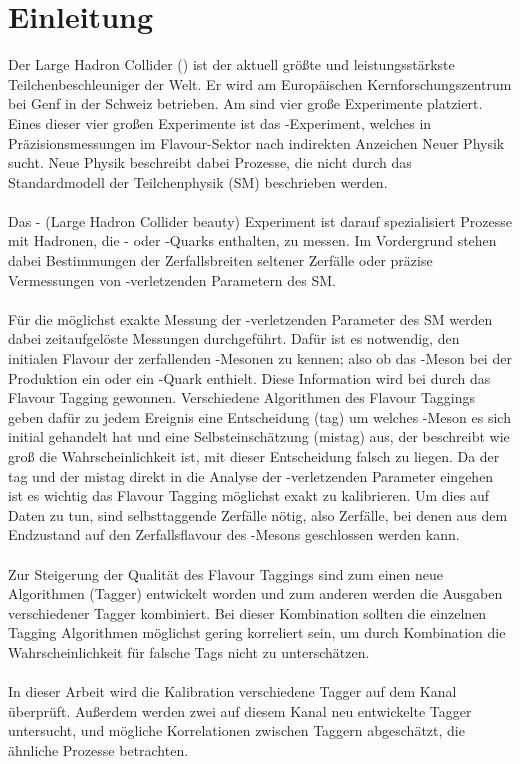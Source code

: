 \chapter{Einleitung}

Der Large Hadron Collider (\lhc) ist der aktuell größte und leistungsstärkste Teilchenbeschleuniger der Welt. Er wird am Europäischen Kernforschungszentrum \cern bei Genf in der Schweiz betrieben. Am \lhc sind vier große Experimente platziert. Eines dieser vier großen Experimente ist das \lhcb-Experiment, welches in Präzisionsmessungen im Flavour-Sektor nach indirekten Anzeichen Neuer Physik sucht. Neue Physik beschreibt dabei Prozesse, die nicht durch das Standardmodell der Teilchenphysik (SM) beschrieben werden.\\
\\
Das \lhcb- (Large Hadron Collider beauty) Experiment ist darauf spezialisiert Prozesse mit Hadronen, die \bquark- oder \cquark-Quarks enthalten, zu messen. Im Vordergrund stehen dabei Bestimmungen der Zerfallsbreiten seltener Zerfälle oder präzise Vermessungen von \CP-verletzenden Parametern des SM.\\
\\
Für die möglichst exakte Messung der \CP-verletzenden Parameter des SM werden dabei zeitaufgelöste Messungen durchgeführt. Dafür ist es notwendig, den initialen Flavour der zerfallenden \B-Mesonen zu kennen; also ob das \B-Meson bei der Produktion ein \bquark oder ein \bquarkbar-Quark enthielt. Diese Information wird bei \lhcb durch das Flavour Tagging gewonnen. Verschiedene Algorithmen des Flavour Taggings geben dafür zu jedem Ereignis eine Entscheidung (tag) um welches \B-Meson es sich initial gehandelt hat und eine Selbsteinschätzung (mistag) aus, der beschreibt wie groß die Wahrscheinlichkeit ist, mit dieser Entscheidung falsch zu liegen. Da der tag und der mistag direkt in die Analyse der \CP-verletzenden Parameter eingehen ist es wichtig das Flavour Tagging möglichst exakt zu kalibrieren. Um dies auf Daten zu tun, sind selbsttaggende Zerfälle nötig, also Zerfälle, bei denen aus dem Endzustand auf den Zerfallsflavour des \B-Mesons geschlossen werden kann. \\
\\
Zur Steigerung der Qualität des Flavour Taggings sind zum einen neue Algorithmen (Tagger) entwickelt worden \cite{charm-tagger} und zum anderen werden die Ausgaben verschiedener Tagger kombiniert. Bei dieser Kombination sollten die einzelnen Tagging Algorithmen möglichst gering korreliert sein, um durch Kombination die Wahrscheinlichkeit für falsche Tags nicht zu unterschätzen.\\
\\
In dieser Arbeit wird die Kalibration verschiedene Tagger auf dem Kanal \mbox{\BdToDpi} überprüft. Außerdem werden zwei auf diesem Kanal neu entwickelte Tagger untersucht, und mögliche Korrelationen zwischen Taggern abgeschätzt, die ähnliche Prozesse betrachten. 
